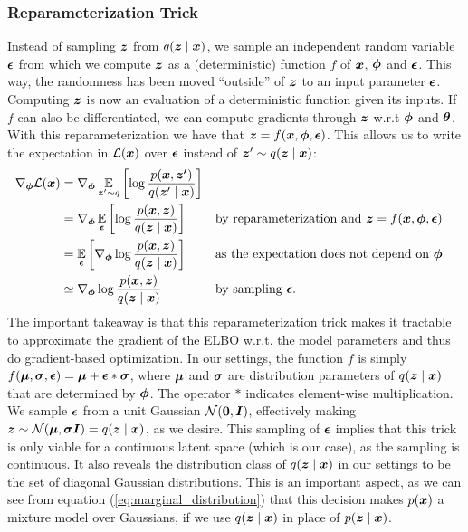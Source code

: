 \subsubsection{Reparameterization Trick}
Instead of sampling $\bm{ z }$ from $q(\bm{ z } \mid \bm{ x })$, we sample an independent random variable $\bm{ \epsilon }$ from which we compute $\bm{ z }$ as a (deterministic) function $f$ of $\bm{ x }$, $\bm{ \phi }$ and $\bm{ \epsilon }$. This way, the randomness has been moved ``outside'' of $\bm{ z }$ to an input parameter $\bm{ \epsilon }$. Computing $\bm{ z }$ is now an evaluation of a deterministic function given its inputs. If $f$ can also be differentiated, we can compute gradients through $\bm{ z }$ w.r.t $\bm{ \phi }$ and $\bm{ \theta }$. With this reparameterization we have that $\bm{ z } = f(\bm{ x }, \bm{ \phi }, \bm{ \epsilon })$. This allows us to write the expectation in $\mathcal{L}(\bm{ x })$ over $\bm{ \epsilon }$ instead of $\bm{ z }' \sim q(\bm{ z } \mid \bm{ x })$:
\begin{align*}
\nabla_{\bm{ \phi }}\mathcal{L}(\bm{ x }) &= \nabla_{\bm{ \phi }} \operatorname*{\mathbb{E}}_{\bm{ z }'\sim q}{\mathopen{} \left[ \log \frac{p(\bm{ x }, \bm{ z' })}{q(\bm{ z }' \mid \bm{ x })} \right] \mathclose{}}\\
&= \nabla_{\bm{ \phi }} \operatorname*{\mathbb{E}}_{\bm{ \epsilon }}{\mathopen{} \left[ \log \frac{p(\bm{ x }, \bm{ z })}{q(\bm{ z } \mid \bm{ x })} \right] \mathclose{}} &&\text{by reparameterization and $\bm{ z } = f(\bm{ x }, \bm{ \phi }, \bm{ \epsilon })$}\\
&= \operatorname*{\mathbb{E}}_{\bm{ \epsilon }}{\mathopen{} \left[ \nabla_{\bm{ \phi }} \log \frac{p(\bm{ x }, \bm{ z })}{q(\bm{ z } \mid \bm{ x })} \right] \mathclose{}} &&\text{as the expectation does not depend on $\bm{ \phi }$}\\
&\simeq \nabla_{\bm{ \phi }} \log \frac{p(\bm{ x }, \bm{ z })}{q(\bm{ z } \mid \bm{ x })} &&\text{by sampling $\bm{ \epsilon }$.}
\end{align*}
The important takeaway is that this reparameterization trick makes it tractable to approximate the gradient of the ELBO w.r.t. the model parameters and thus do gradient-based optimization. In our settings, the function $f$ is simply $f(\bm{ \mu }, \bm{ \sigma }, \bm{ \epsilon }) = \bm{ \mu } + \bm{ \epsilon } * \bm{ \sigma }$, where $\bm{ \mu }$ and $\bm{ \sigma }$ are distribution parameters of $q(\bm{ z } \mid \bm{ x })$ that are determined by $\bm{ \phi }$. The operator $*$ indicates element-wise multiplication. We sample $\bm{ \epsilon }$ from a unit Gaussian $\mathcal{N}{\mathopen{} \left( \bm{ 0 }, \bm{ I } \right) \mathclose{}}$, effectively making $\bm{ z } \sim \mathcal{N}{\mathopen{} \left( \bm{ \mu }, \bm{ \sigma I } \right) \mathclose{}} = q(\bm{ z } \mid \bm{ x })$, as we desire. This sampling of $\bm{ \epsilon }$ implies that this trick is only viable for a continuous latent space (which is our case), as the sampling is continuous. It also reveals the distribution class of $q(\bm{ z } \mid \bm{ x })$ in our settings to be the set of diagonal Gaussian distributions. This is an important aspect, as we can see from equation (\ref{eq:marginal_distribution}) that this decision makes $p(\bm{ x })$ a mixture model over Gaussians, if we use $q(\bm{ z } \mid \bm{ x })$ in place of $p(\bm{ z } \mid \bm{ x })$.


